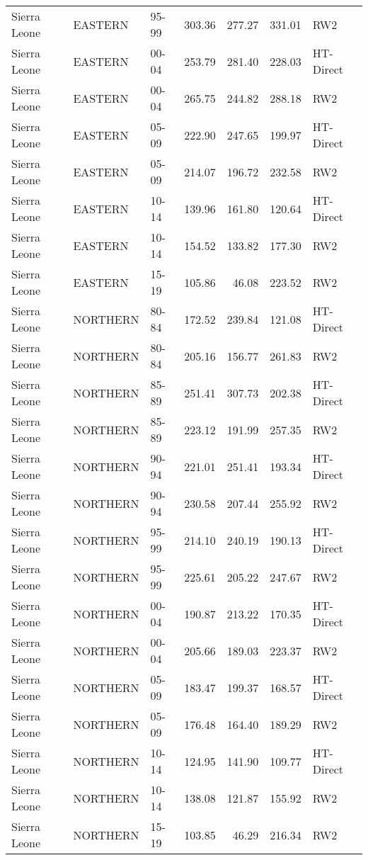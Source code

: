 \begin{longtable}{lllrrrl}
  Sierra Leone & EASTERN & 95-99 & 303.36 & 277.27 & 331.01 & RW2 \\ 
  Sierra Leone & EASTERN & 00-04 & 253.79 & 281.40 & 228.03 & HT-Direct \\ 
  Sierra Leone & EASTERN & 00-04 & 265.75 & 244.82 & 288.18 & RW2 \\ 
  Sierra Leone & EASTERN & 05-09 & 222.90 & 247.65 & 199.97 & HT-Direct \\ 
  Sierra Leone & EASTERN & 05-09 & 214.07 & 196.72 & 232.58 & RW2 \\ 
  Sierra Leone & EASTERN & 10-14 & 139.96 & 161.80 & 120.64 & HT-Direct \\ 
  Sierra Leone & EASTERN & 10-14 & 154.52 & 133.82 & 177.30 & RW2 \\ 
  Sierra Leone & EASTERN & 15-19 & 105.86 & 46.08 & 223.52 & RW2 \\ 
  Sierra Leone & NORTHERN & 80-84 & 172.52 & 239.84 & 121.08 & HT-Direct \\ 
  Sierra Leone & NORTHERN & 80-84 & 205.16 & 156.77 & 261.83 & RW2 \\ 
  Sierra Leone & NORTHERN & 85-89 & 251.41 & 307.73 & 202.38 & HT-Direct \\ 
  Sierra Leone & NORTHERN & 85-89 & 223.12 & 191.99 & 257.35 & RW2 \\ 
  Sierra Leone & NORTHERN & 90-94 & 221.01 & 251.41 & 193.34 & HT-Direct \\ 
  Sierra Leone & NORTHERN & 90-94 & 230.58 & 207.44 & 255.92 & RW2 \\ 
  Sierra Leone & NORTHERN & 95-99 & 214.10 & 240.19 & 190.13 & HT-Direct \\ 
  Sierra Leone & NORTHERN & 95-99 & 225.61 & 205.22 & 247.67 & RW2 \\ 
  Sierra Leone & NORTHERN & 00-04 & 190.87 & 213.22 & 170.35 & HT-Direct \\ 
  Sierra Leone & NORTHERN & 00-04 & 205.66 & 189.03 & 223.37 & RW2 \\ 
  Sierra Leone & NORTHERN & 05-09 & 183.47 & 199.37 & 168.57 & HT-Direct \\ 
  Sierra Leone & NORTHERN & 05-09 & 176.48 & 164.40 & 189.29 & RW2 \\ 
  Sierra Leone & NORTHERN & 10-14 & 124.95 & 141.90 & 109.77 & HT-Direct \\ 
  Sierra Leone & NORTHERN & 10-14 & 138.08 & 121.87 & 155.92 & RW2 \\ 
  Sierra Leone & NORTHERN & 15-19 & 103.85 & 46.29 & 216.34 & RW2 \\ 

\end{longtable}
